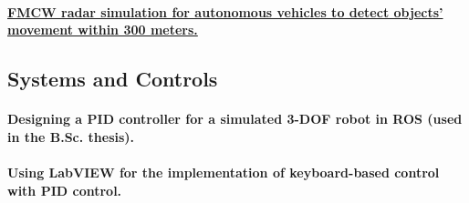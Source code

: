 \documentclass[a4paper]{article}
\begin{document}
\paragraph{\href{https://github.com/ake1999/FMCW_Radar_Ake}{FMCW radar simulation for autonomous vehicles to detect objects' movement within 300 meters.}}
\subsection{Systems and Controls}
\paragraph{Designing a PID controller for a simulated 3-DOF robot in ROS (used in the B.Sc. thesis).}
\paragraph{Using LabVIEW for the implementation of keyboard-based control with PID control.}
\end{document}

